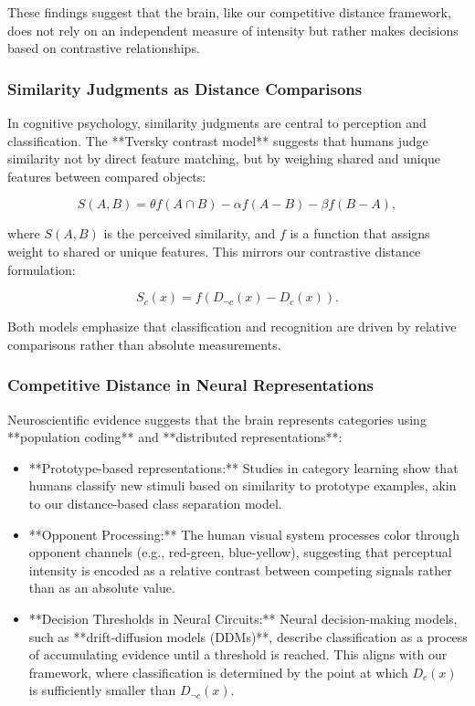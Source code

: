 \documentclass[12pt]{article}
\begin{document}
These findings suggest that the brain, like our competitive distance framework, does not rely on an independent measure of intensity but rather makes decisions based on contrastive relationships.

\subsubsection{Similarity Judgments as Distance Comparisons}

In cognitive psychology, similarity judgments are central to perception and classification. The **Tversky contrast model** \cite{tversky1977features} suggests that humans judge similarity not by direct feature matching, but by weighing shared and unique features between compared objects:

\[
S(A, B) = \theta f(A \cap B) - \alpha f(A - B) - \beta f(B - A),
\]

where \( S(A, B) \) is the perceived similarity, and \( f \) is a function that assigns weight to shared or unique features. This mirrors our contrastive distance formulation:

\[
S_c(x) = f(D_{\neg c}(x) - D_c(x)).
\]

Both models emphasize that classification and recognition are driven by relative comparisons rather than absolute measurements.

\subsubsection{Competitive Distance in Neural Representations}

Neuroscientific evidence suggests that the brain represents categories using **population coding** and **distributed representations**:

\begin{itemize}
    \item **Prototype-based representations:** Studies in category learning show that humans classify new stimuli based on similarity to prototype examples, akin to our distance-based class separation model.
    \item **Opponent Processing:** The human visual system processes color through opponent channels (e.g., red-green, blue-yellow), suggesting that perceptual intensity is encoded as a relative contrast between competing signals rather than as an absolute value.
    \item **Decision Thresholds in Neural Circuits:** Neural decision-making models, such as **drift-diffusion models (DDMs)**, describe classification as a process of accumulating evidence until a threshold is reached. This aligns with our framework, where classification is determined by the point at which \( D_c(x) \) is sufficiently smaller than \( D_{\neg c}(x) \).
\end{itemize}
\end{document}

